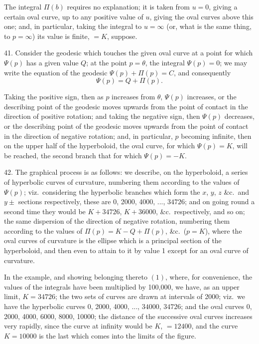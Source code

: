 \documentclass[11pt,a4paper]{book}
\begin{document}
The integral $\Pi(b)$ requires no explanation; it is taken from $u = 0$, giving a certain oval curve, up to any positive value of $u$, giving the oval curves above this one; and, in particular, taking the integral to $u = \infty$ (or, what is the same thing, to $p = \infty$) its value is finite, $= K$, suppose.

41. Consider the geodesic which touches the given oval curve at a point for which $\Psi(p)$ has a given value $Q$; at the point $p = \theta$, the integral $\Psi(p) = 0$; we may write the equation of the geodesic $\Psi(p) + \Pi(p) = C$, and consequently
\[
\Psi(p) = Q + \Pi(p).
\]

Taking the positive sign, then as $p$ increases from $\theta$, $\Psi(p)$ increases, or the describing point of the geodesic moves upwards from the point of contact in the direction of positive rotation; and taking the negative sign, then $\Psi(p)$ decreases, or the describing point of the geodesic moves upwards from the point of contact in the direction of negative rotation; and, in particular, $p$ becoming infinite, then on the upper half of the hyperboloid, the oval curve, for which $\Psi(p) = K$, will be reached, the second branch that for which $\Psi(p) = -K$.

42. The graphical process is as follows: we describe, on the hyperboloid, a series of hyperbolic curves of curvature, numbering them according to the values of $\Psi(p)$; viz.\ considering the hyperbolic branches which form the $x$, $y$, $z$ \&c.\ and $y \pm$ sections respectively, these are 0, 2000, 4000, ..., $34726$; and on going round a second time they would be $K + 34726$, $K + 36000$, \&c.\ respectively, and so on; the same dispersion of the direction of negative rotation, numbering them according to the values of $\Pi(p) = K - Q + \Pi(p)$, \&c.\ ($p = K$), where the oval curves of curvature is the ellipse which is a principal section of the hyperboloid, and then even to attain to it by value 1 except for an oval curve of curvature.

In the example, and showing belonging thereto $(1)$, where, for convenience, the values of the integrals have been multiplied by 100,000, we have, as an upper limit, $K = 34726$; the two sets of curves are drawn at intervals of 2000; viz.\ we have the hyperbolic curves 0, 2000, 4000, ..., $34000$, $34726$; and the oval curves 0, 2000, 4000, 6000, 8000, 10000; the distance of the successive oval curves increases very rapidly, since the curve at infinity would be $K$, $= 12400$, and the curve $K = 10000$ is the last which comes into the limits of the figure.
\end{document}
